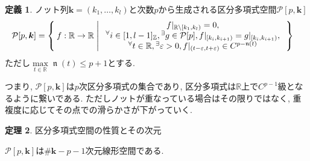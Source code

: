 \documentclass{jsarticle}
\newcommand\setR{\mathbb{R}}
\newcommand\squa[1]{[#1]}
\newcommand\E[1]{\!\,{\vphantom{#1}}^\exists #1}
\newcommand\A[1]{\!\,{\vphantom{#1}}^\forall #1}
\newcommand\Z[2]{\squa{#1,#2}_\mathbb{Z}}
\DeclareMathOperator{\N}{\mathfrak{n}}
\theoremstyle{definition}%
\newtheorem{thm}{定理}
\newtheorem{defn}[thm]{定義}
\begin{document}
\begin{screen}
	\begin{defn}
        \label{Def305}
		ノット列$\bm{k}=(k_1,\dots,k_l)$と次数$p$から生成される区分多項式空間$\mathcal{P}[p, \bm{k}]$
		\begin{align}
			\mathcal{P}[p, \bm{k}]
			&=\Set{
				f:\setR\to\setR |
				\begin{array}{c}
					f|_{\mathbb{R}\backslash[k_1,k_l)}=0, \\
					\A i\in\Z{1}{l-1}, \E g\in \mathcal{P}[p], f|_{[k_{i},k_{i+1})}=g|_{[k_{i},k_{i+1})}, \\
					\A t\in\setR, \E \varepsilon>0, f|_{(t-\varepsilon,t+\varepsilon)}\in C^{p-\N(t)}
				\end{array}
			}
		\end{align}
		ただし$\max\limits_{t\in\setR}\N(t)\le p+1$とする.
	\end{defn}
\end{screen}
つまり, $\mathcal{P}[p, \bm{k}]$は$p$次区分多項式の集合であり, 区分多項式は$\mathbb{R}$上で$C^{p-1}$級となるように繋いである.
ただしノットが重なっている場合はその限りではなく, 重複度に応じてその点での滑らかさが下がっていく.


\begin{screen}
	\begin{thm}
		\label{Thm308}
		区分多項式空間の性質とその次元

		$\mathcal{P}[p, \bm{k}]$は$\#{\bm{k}}-p-1$次元線形空間である.
	\end{thm}
\end{screen}
\end{document}
